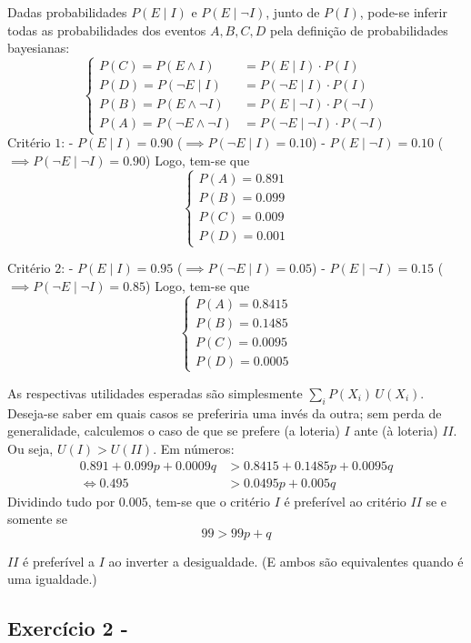 \documentclass[12pt]{article}
\numberwithin{equation}{section}
\theoremstyle{plain}
\theoremstyle{definition}
\theoremstyle{remark}
\begin{document}
Dadas probabilidades \(P(E \mid I)\) e \(P(E \mid \lnot I)\), junto de \(P(I)\), pode-se inferir todas as probabilidades dos eventos \(A, B, C, D\) pela definição de probabilidades bayesianas:
\[
\begin{cases}
P(C) = P(E \land I) &= P(E \mid I) \cdot P(I) \\
P(D) = P(\lnot E \mid I) &= P(\lnot E \mid I) \cdot P(I) \\
P(B) = P(E \land \lnot I) &= P(E \mid \lnot I) \cdot P(\lnot I) \\
P(A) = P(\lnot E \land \lnot I) &= P(\lnot E \mid \lnot I) \cdot P(\lnot I)
\end{cases}
\]
Critério \(1\): - \(P(E \mid I) = 0.90\) (\(\implies P(\lnot E \mid I) = 0.10\)) - \(P(E \mid \lnot I) = 0.10\) (\(\implies P(\lnot E \mid \lnot I) = 0.90\)) Logo, tem-se que
\[
\begin{cases}
P(A) = 0.891 \\
P(B) = 0.099 \\
P(C) = 0.009 \\
P(D) = 0.001
\end{cases}
\]

Critério \(2\): - \(P(E \mid I) = 0.95\) (\(\implies P(\lnot E \mid I) = 0.05\)) - \(P(E \mid \lnot I) = 0.15\) (\(\implies P(\lnot E \mid \lnot I) = 0.85\)) Logo, tem-se que
\[
\begin{cases}
P(A) = 0.8415 \\
P(B) = 0.1485 \\
P(C) = 0.0095 \\
P(D) = 0.0005
\end{cases}
\]

As respectivas utilidades esperadas são simplesmente \(\sum \limits_{i} P(X_{i}) \, U(X_{i})\). Deseja-se saber em quais casos se preferiria uma invés da outra; sem perda de generalidade, calculemos o caso de que se prefere (a loteria) \(I\) ante (à loteria) \(II\). Ou seja, \(U(I) > U(II)\). Em números:
\[
\begin{align}
0.891 + 0.099 p + 0.0009 q &> 0.8415 + 0.1485p + 0.0095 q \\
\iff 0.495 &> 0.0495p + 0.005q
\end{align}
\]
Dividindo tudo por \(0.005\), tem-se que o critério \(I\) é preferível ao critério \(II\) se e somente se
\[
99 > 99p + q
\]

\(II\) é preferível a \(I\) ao inverter a desigualdade. (E ambos são equivalentes quando é uma igualdade.)

\hypertarget{exercuxedcio-2---mas-colell1995-exemplo-6.c.1}{%
\subsection{\texorpdfstring{Exercício 2 - \parencite[, exemplo 6.C.1]{Mas-Colell1995}}{Exercício 2 - }}\label{exercuxedcio-2---mas-colell1995-exemplo-6.c.1}}
\end{document}
